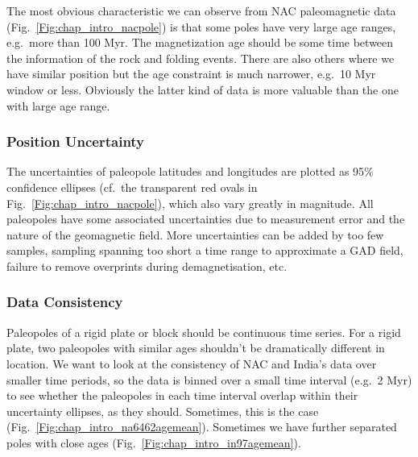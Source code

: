The most obvious characteristic we can observe from NAC paleomagnetic data
(Fig.~\ref{Fig:chap_intro_nacpole}) is that some poles have very large age
ranges, e.g.\ more than 100 Myr. The magnetization age should be some time
between the information of the rock and folding events. There are also others
where we have similar position but the age constraint is much narrower, e.g.\ 10
Myr window or less. Obviously the latter kind of data is more valuable than the
one with large age range.

\subsubsection{Position Uncertainty}\label{sec:posu}

The uncertainties of paleopole latitudes and longitudes are plotted as 95\%
confidence ellipses (cf.\ the transparent red ovals in
Fig.~\ref{Fig:chap_intro_nacpole}), which also vary greatly in magnitude. All
paleopoles have some associated uncertainties due to measurement error and the
nature of the geomagnetic field. More uncertainties can be added by too few
samples, sampling spanning too short a time range to approximate a GAD field,
failure to remove overprints during demagnetisation, etc.

\subsubsection{Data Consistency}\label{sec:datcons}

Paleopoles of a rigid plate or block should be continuous time series. For a
rigid plate, two paleopoles with similar ages shouldn't be dramatically
different in location. We want to look at the consistency of NAC and India's
data over smaller time periods, so the data is binned over a small time interval
(e.g.\ 2 Myr) to see whether the paleopoles in each time interval overlap within
their uncertainty ellipses, as they should. Sometimes, this is the case
(Fig.~\ref{Fig:chap_intro_na6462agemean}). Sometimes we have further separated
poles with close ages (Fig.~\ref{Fig:chap_intro_in97agemean}).

